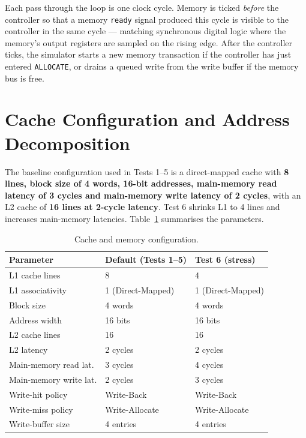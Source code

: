 \documentclass[11pt,a4paper]{article}
\begin{document}
Each pass through the loop is one clock cycle. Memory is ticked \emph{before}
the controller so that a memory \texttt{ready} signal produced this cycle is
visible to the controller in the same cycle — matching synchronous digital
logic where the memory's output registers are sampled on the rising edge.
After the controller ticks, the simulator starts a new memory transaction if
the controller has just entered \texttt{ALLOCATE}, or drains a queued write
from the write buffer if the memory bus is free.

\section{Cache Configuration and Address Decomposition}\label{sec:cfg}

The baseline configuration used in Tests 1–5 is a direct-mapped cache with
\textbf{8 lines, block size of 4 words, 16-bit addresses, main-memory read
latency of 3 cycles and main-memory write latency of 2 cycles}, with an L2
cache of \textbf{16 lines at 2-cycle latency}. Test 6 shrinks L1 to 4 lines
and increases main-memory latencies. Table~\ref{tab:cfg} summarises the
parameters.

\begin{table}[h]
    \centering
    \caption{Cache and memory configuration.}
    \label{tab:cfg}
    \begin{tabular}{@{}lll@{}}
        \toprule
        \textbf{Parameter} & \textbf{Default (Tests 1–5)} & \textbf{Test 6 (stress)} \\
        \midrule
        L1 cache lines          & 8                  & 4 \\
        L1 associativity        & 1 (Direct-Mapped)  & 1 (Direct-Mapped) \\
        Block size              & 4 words            & 4 words \\
        Address width           & 16 bits            & 16 bits \\
        L2 cache lines          & 16                 & 16 \\
        L2 latency              & 2 cycles           & 2 cycles \\
        Main-memory read lat.   & 3 cycles           & 4 cycles \\
        Main-memory write lat.  & 2 cycles           & 3 cycles \\
        Write-hit policy        & Write-Back         & Write-Back \\
        Write-miss policy       & Write-Allocate     & Write-Allocate \\
        Write-buffer size       & 4 entries          & 4 entries \\
        \bottomrule
    \end{tabular}
\end{table}
\end{document}
